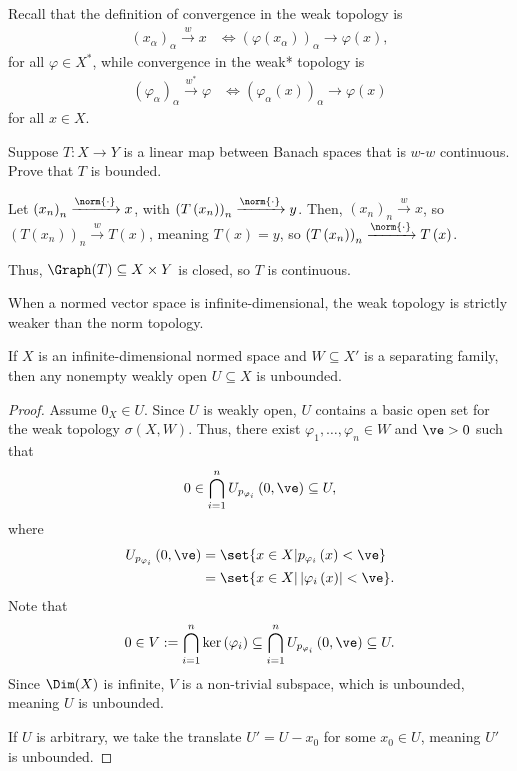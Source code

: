 \documentclass[10pt]{mypackage}
\begin{document}
Recall that the definition of convergence in the weak topology is
\begin{align*}
  \left(x_{\alpha}\right)_{\alpha}\xrightarrow{w}x &\Leftrightarrow \left(\varphi\left(x_{\alpha}\right)\right)_{\alpha}\rightarrow \varphi\left(x\right),
\end{align*}
for all $\varphi\in X^{\ast}$, while convergence in the weak* topology is
\begin{align*}
  \left(\varphi_{\alpha}\right)_{\alpha}\xrightarrow{w^{\ast}}\varphi &\Leftrightarrow \left(\varphi_{\alpha}\left(x\right)\right)_{\alpha}\rightarrow \varphi\left(x\right)
\end{align*}
for all $x\in X$.
\begin{exercise}
  Suppose $T: X\rightarrow Y$ is a linear map between Banach spaces that is $w$-$w$ continuous. Prove that $T$ is bounded.
\end{exercise}
\begin{solution}
  Let $\left(x_n\right)_n\xrightarrow{\norm{\cdot}}x$, with $\left(T\left(x_n\right)\right)_n\xrightarrow{\norm{\cdot}} y$. Then, $\left(x_n\right)_n\xrightarrow{w}x$, so $\left(T\left(x_n\right)\right)_n\xrightarrow{w}T\left(x\right)$, meaning $T\left(x\right) = y$, so $\left(T\left(x_n\right)\right)_n\xrightarrow{\norm{\cdot}}T\left(x\right)$.\newline

  Thus, $\Graph(T)\subseteq X\times Y$ is closed, so $T$ is continuous.
\end{solution}
When a normed vector space is infinite-dimensional, the weak topology is strictly weaker than the norm topology.
\begin{proposition}
  If $X$ is an infinite-dimensional normed space and $W\subseteq X'$ is a separating family, then any nonempty weakly open $U\subseteq X$ is unbounded.
\end{proposition}
\begin{proof}
  Assume $0_X\in U$. Since $U$ is weakly open, $U$ contains a basic open set for the weak topology $\sigma\left(X,W\right)$. Thus, there exist $\varphi_1,\dots,\varphi_n\in W$ and $\ve > 0$ such that
  \begin{align*}
    0\in \bigcap_{i=1}^{n}U_{p_{\varphi_i}}\left(0,\ve\right)\subseteq U,
  \end{align*}
  where
  \begin{align*}
    U_{p_{\varphi_i}}\left(0,\ve\right) &= \set{x\in X | p_{\varphi_i}\left(x\right) < \ve}\\
                                        &= \set{x\in X | \left\vert \varphi_i\left(x\right) \right\vert < \ve}.
  \end{align*}
  Note that
  \begin{align*}
    0\in V := \bigcap_{i=1}^{n}\ker\left(\varphi_i\right) \subseteq \bigcap_{i=1}^{n}U_{p_{\varphi_i}}\left(0,\ve\right)\subseteq U.
  \end{align*}
  Since $\Dim(X)$ is infinite, $V$ is a non-trivial subspace, which is unbounded, meaning $U$ is unbounded.\newline

  If $U$ is arbitrary, we take the translate $U' = U - x_0$ for some $x_0\in U$, meaning $U'$ is unbounded.
\end{proof}
\end{document}
